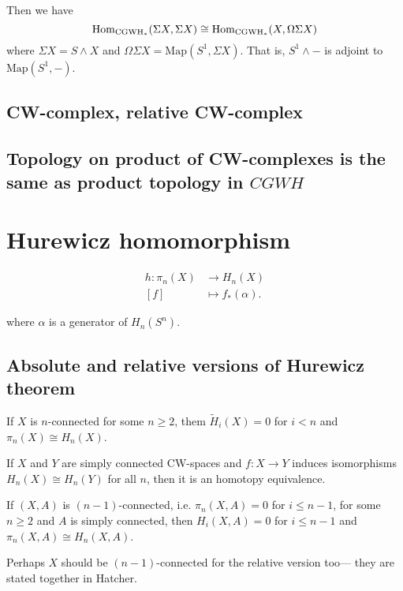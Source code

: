 \begin{remark}
 Then we have
$$\mathop{\mathrm{Hom}}\nolimits_{\text{CGWH}_*}(\Sigma X,\Sigma X)\cong\mathop{\mathrm{Hom}}\nolimits_{\text{CGWH}_*}(X,\Omega\Sigma X)$$
where $\Sigma X=S\wedge X$ and $\Omega\Sigma X=\text{Map}(S^1,\Sigma X)$. That is, $S^1\wedge-$ is adjoint to $\text{Map}(S^1,-)$.

\subsection{CW-complex, relative CW-complex}
\subsection{Topology on product of CW-complexes is the same as product topology in $CGWH$}



\section{Hurewicz homomorphism}
\label{section-Hurewicz-homomorphism}

\begin{definition}
\begin{align*}
h: \pi_{n}(X) &\longrightarrow H_{n}(X) \\
[f] &\longmapsto f_{*}(\alpha)
.\end{align*}
\end{definition}
where $\alpha$ is a generator of $ H_{n}(S^{n})$.

\subsection{Absolute and relative versions of Hurewicz theorem}
\label{subsection-absolute-and-relative-Hurewicz-theorem}

\begin{theorem}[Hurewicz]
\label{theorem-Hurewicz-absolute}
If $X$ is $n$-connected for some $n \geq 2$, them $\tilde{H}_i(X)=0$ for $i<n$
and $\pi_{n}(X)\cong H_n(X)$.
\end{theorem}

\begin{lemma}
\label{lemma-Hurewicz-homomorphism-gives-homotopy-equivalence}
If $X$ and $Y$ are simply connected CW-spaces and  $f:X \to Y$ induces
isomorphisms $H_n(X) \cong H_n(Y)$ for all $n$, then it is an homotopy
equivalence.
\end{lemma}

\begin{theorem}[Hurewicz]
\label{theorem-Hurewicz-relative}
If $(X,A)$ is $(n-1)$-connected, i.e. $\pi_{n}(X,A)=0$ for $i \leq n-1$, for 
some $n\geq 2$ and $A$ is simply connected, then $H_i(X,A)=0$ for $i\leq n-1$ 
and $\pi_{n}(X,A)\cong H_n(X,A)$.
\end{theorem}
Perhaps $X$ should be $(n-1)$-connected for the relative version too---
they are stated together in Hatcher.


\end{remark}
